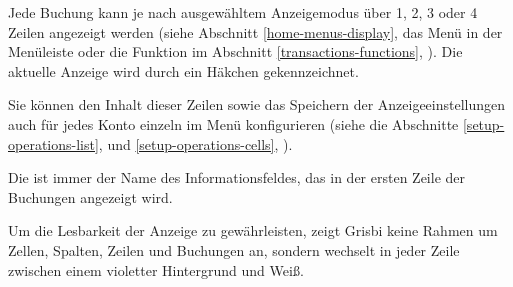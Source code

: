 Jede Buchung kann je nach ausgewähltem Anzeigemodus über 1, 2, 3 oder 4 Zeilen angezeigt werden (siehe Abschnitt \vref{home-menus-display}, das Menü  in der Menüleiste oder die Funktion  im Abschnitt \vref{transactions-functions}, ). Die aktuelle Anzeige wird durch ein Häkchen gekennzeichnet.

Sie können den Inhalt dieser Zeilen sowie das Speichern der Anzeigeeinstellungen auch für jedes Konto einzeln im Menü  konfigurieren (siehe die Abschnitte \vref{setup-operations-list},  und \vref{setup-operations-cells}, ).

Die  ist immer der Name des Informationsfeldes, das in der ersten Zeile der Buchungen angezeigt wird.


Um die Lesbarkeit der Anzeige zu gewährleisten, zeigt Grisbi keine Rahmen um Zellen, Spalten, Zeilen und Buchungen an, sondern wechselt in jeder Zeile zwischen einem {\setlength{\fboxsep}{2pt}\colorbox[RGB]{215,215,255}{violetter Hintergrund}} und Weiß.

